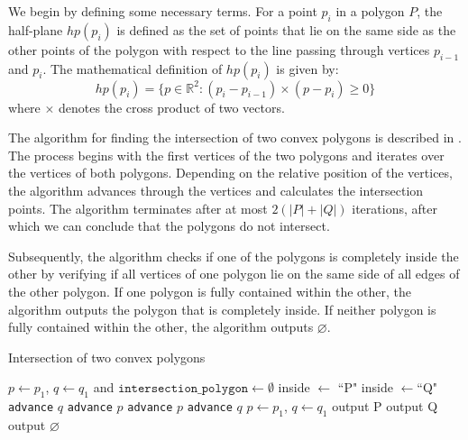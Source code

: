 \documentclass[12pt]{article}
\begin{document}
We begin by defining some necessary terms. For a point \( p_{i} \) in a polygon \( P \), the half-plane \( hp(p_{i}) \) is defined as the set of points that lie on the same side as the other points of the polygon with respect to the line passing through vertices \( p_{i-1} \) and \( p_{i} \). The mathematical definition of \( hp(p_{i}) \) is given by:
\[
hp(p_{i}) = \{ p \in \mathbb{R}^{2} : (p_{i} - p_{i-1}) \times (p - p_{i}) \geq 0 \}
\]
where \( \times \) denotes the cross product of two vectors.

The algorithm for finding the intersection of two convex polygons is described in . The process begins with the first vertices of the two polygons and iterates over the vertices of both polygons. Depending on the relative position of the vertices, the algorithm advances through the vertices and calculates the intersection points. The algorithm terminates after at most \( 2(|P| + |Q|) \) iterations, after which we can conclude that the polygons do not intersect. 

Subsequently, the algorithm checks if one of the polygons is completely inside the other by verifying if all vertices of one polygon lie on the same side of all edges of the other polygon. If one polygon is fully contained within the other, the algorithm outputs the polygon that is completely inside. If neither polygon is fully contained within the other, the algorithm outputs \( \varnothing \).


\begin{algorithm}[H]
    \caption{Intersection of two convex polygons} \label{alg:2}
    \begin{algorithmic}[1]
    \STATE $p \leftarrow p_1$, $q \leftarrow q_1$ and \( \texttt{intersection\_polygon} \leftarrow \emptyset \)
    \REPEAT
            \ELSE
                    \STATE inside $\gets$ ``P"
                \ELSE
                    \STATE inside $\gets$``Q"
                \ENDIF
            \ENDIF
        \ENDIF
                \STATE \texttt{advance} $q$
            \ELSE
                \STATE \texttt{advance} $p$
            \ENDIF
        \ELSE
                \STATE \texttt{advance} $p$
            \ELSE
                \STATE \texttt{advance} $q$
            \ENDIF
        \ENDIF
    \STATE \(p \leftarrow p_1\), \(q \leftarrow q_1\)
        \STATE output P
        \STATE output Q
    \ELSE
        \STATE output \(\varnothing\)
    \ENDIF
\end{algorithmic}
\end{algorithm}
\end{document}
